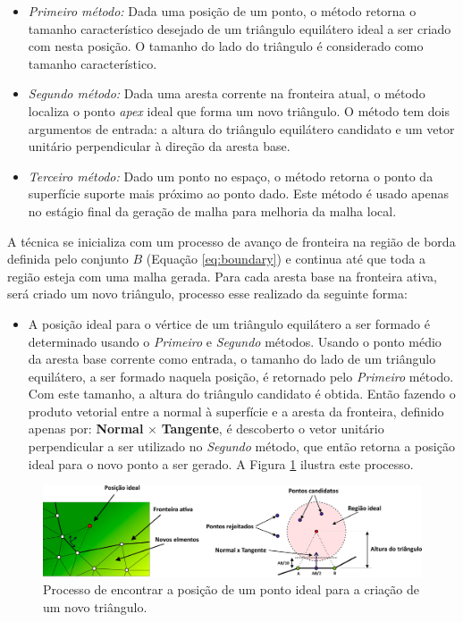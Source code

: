 \begin{itemize}  
\item \textit{Primeiro método:} Dada uma posição de um ponto, o método retorna o tamanho característico desejado de um triângulo equilátero ideal a ser criado com nesta posição. O tamanho do lado do triângulo é considerado como tamanho característico.
\item \textit{Segundo método:} Dada uma aresta corrente na fronteira atual, o método localiza o ponto \textit{apex} ideal que forma um novo triângulo. O método tem dois argumentos de entrada: a altura do triângulo equilátero candidato e um vetor unitário perpendicular à direção da aresta base. 
\item \textit{Terceiro método:} Dado um ponto no espaço, o método retorna o ponto da superfície suporte mais próximo ao ponto dado. Este método é usado apenas no estágio final da geração de malha para melhoria da malha local.
\end{itemize}

A técnica se inicializa com um processo de avanço de fronteira na região de borda definida pelo conjunto $B$ (Equação \ref{eq:boundary}) e continua até que toda a região esteja com uma malha gerada. Para cada aresta base na fronteira ativa, será criado um novo triângulo, processo esse realizado da seguinte forma:

\begin{itemize}
    \item A posição ideal para o vértice de um triângulo equilátero a ser formado é determinado usando o \textit{Primeiro} e \textit{Segundo} métodos. Usando o ponto médio da aresta base corrente como entrada, o tamanho do lado de um triângulo equilátero, a ser formado naquela posição, é retornado pelo \textit{Primeiro} método. Com este tamanho, a altura do triângulo candidato é obtida. Então fazendo o produto vetorial entre a normal à superfície e a aresta da fronteira, definido apenas por: \textbf{Normal} $\times$ \textbf{Tangente}, é descoberto o vetor unitário perpendicular a ser utilizado no \textit{Segundo} método, que então retorna a posição ideal para o novo ponto a ser gerado. A Figura \ref{fig:meshgeneration} ilustra este processo.
\end{itemize}

\begin{figure}[!h]
\captionsetup{width=\linewidth}
\centering
\includegraphics[width=\linewidth]{figuras/meshgeneration.jpg}
\caption{Processo de encontrar a posição de um ponto ideal para a criação de um novo triângulo.}
\label{fig:meshgeneration}
\end{figure}


